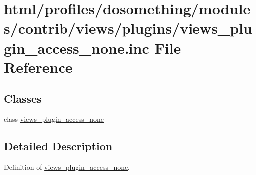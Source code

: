 \hypertarget{views__plugin__access__none_8inc}{
\section{html/profiles/dosomething/modules/contrib/views/plugins/views\_\-plugin\_\-access\_\-none.inc File Reference}
\label{views__plugin__access__none_8inc}
}
\subsection*{Classes}
\begin{DoxyCompactItemize}
\item 
class \hyperlink{classviews__plugin__access__none}{views\_\-plugin\_\-access\_\-none}
\end{DoxyCompactItemize}


\subsection{Detailed Description}
Definition of \hyperlink{classviews__plugin__access__none}{views\_\-plugin\_\-access\_\-none}. 